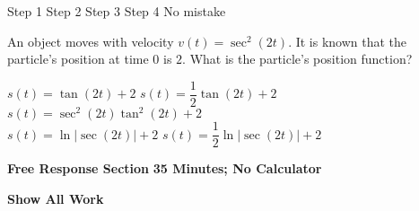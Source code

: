 \begin{questions}
    \begin{oneparchoices}
        \choice Step 1
        \choice Step 2
        \choice Step 3
        \choice Step 4
        \choice No mistake
    \end{oneparchoices} \par \horizontalline

    \question An object moves with velocity $v(t) = \sec^2 (2t)$. It is known that the particle's position at time $0$ is $2$. What is the particle's position function? \\

    \begin{oneparchoices}
        \choice $s(t) = \tan (2t) + 2$
        \choice $s(t) = \dfrac{1}{2}\tan (2t) + 2$
        \choice $s(t) = \sec^2 (2t)\tan^2 (2t) + 2$ \\[11pt]
        \makebox[0.18\textwidth] \choice $s(t) = \ln |\sec (2t)| + 2$
        \makebox[0.15\textwidth] \choice $s(t) = \dfrac{1}{2} \ln |\sec (2t)| + 2$
    \end{oneparchoices} \par \horizontalline
\end{questions}

\newpage
{}

\textbf{Free Response Section} \hfill \textbf{35 Minutes; No Calculator} \\[11pt]

\begin{center}
    \textbf{Show All Work}
\end{center}
\vspace{11pt}

